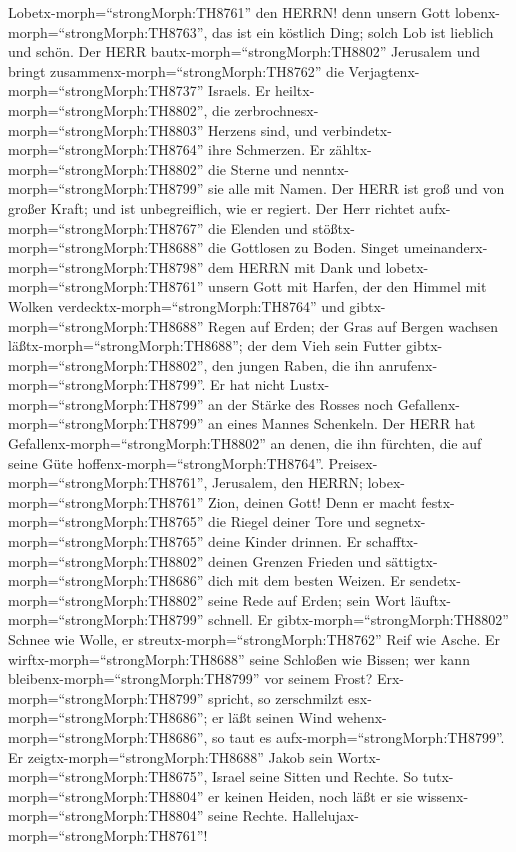 Lobetx-morph=``strongMorph:TH8761'' den HERRN! denn unsern
Gott lobenx-morph=``strongMorph:TH8763'', das ist ein köstlich Ding;
solch Lob ist lieblich und schön.  Der HERR
bautx-morph=``strongMorph:TH8802'' Jerusalem und bringt
zusammenx-morph=``strongMorph:TH8762'' die
Verjagtenx-morph=``strongMorph:TH8737'' Israels.  Er
heiltx-morph=``strongMorph:TH8802'', die
zerbrochnesx-morph=``strongMorph:TH8803'' Herzens sind, und
verbindetx-morph=``strongMorph:TH8764'' ihre Schmerzen.  Er
zähltx-morph=``strongMorph:TH8802'' die Sterne und
nenntx-morph=``strongMorph:TH8799'' sie alle mit Namen.  Der
HERR ist groß und von großer Kraft; und ist unbegreiflich, wie er
regiert.  Der Herr richtet aufx-morph=``strongMorph:TH8767''
die Elenden und stößtx-morph=``strongMorph:TH8688'' die Gottlosen zu
Boden.  Singet umeinanderx-morph=``strongMorph:TH8798'' dem
HERRN mit Dank und lobetx-morph=``strongMorph:TH8761'' unsern Gott mit
Harfen,  der den Himmel mit Wolken
verdecktx-morph=``strongMorph:TH8764'' und
gibtx-morph=``strongMorph:TH8688'' Regen auf Erden; der Gras auf Bergen
wachsen läßtx-morph=``strongMorph:TH8688'';  der dem Vieh
sein Futter gibtx-morph=``strongMorph:TH8802'', den jungen Raben, die
ihn anrufenx-morph=``strongMorph:TH8799''.  Er hat nicht
Lustx-morph=``strongMorph:TH8799'' an der Stärke des Rosses noch
Gefallenx-morph=``strongMorph:TH8799'' an eines Mannes Schenkeln.
 Der HERR hat Gefallenx-morph=``strongMorph:TH8802'' an
denen, die ihn fürchten, die auf seine Güte
hoffenx-morph=``strongMorph:TH8764''. 
Preisex-morph=``strongMorph:TH8761'', Jerusalem, den HERRN;
lobex-morph=``strongMorph:TH8761'' Zion, deinen Gott!  Denn
er macht festx-morph=``strongMorph:TH8765'' die Riegel deiner Tore und
segnetx-morph=``strongMorph:TH8765'' deine Kinder drinnen. 
Er schafftx-morph=``strongMorph:TH8802'' deinen Grenzen Frieden und
sättigtx-morph=``strongMorph:TH8686'' dich mit dem besten Weizen.
 Er sendetx-morph=``strongMorph:TH8802'' seine Rede auf
Erden; sein Wort läuftx-morph=``strongMorph:TH8799'' schnell.
 Er gibtx-morph=``strongMorph:TH8802'' Schnee wie Wolle, er
streutx-morph=``strongMorph:TH8762'' Reif wie Asche.  Er
wirftx-morph=``strongMorph:TH8688'' seine Schloßen wie Bissen; wer kann
bleibenx-morph=``strongMorph:TH8799'' vor seinem Frost? 
Erx-morph=``strongMorph:TH8799'' spricht, so zerschmilzt
esx-morph=``strongMorph:TH8686''; er läßt seinen Wind
wehenx-morph=``strongMorph:TH8686'', so taut es
aufx-morph=``strongMorph:TH8799''.  Er
zeigtx-morph=``strongMorph:TH8688'' Jakob sein
Wortx-morph=``strongMorph:TH8675'', Israel seine Sitten und Rechte.
 So tutx-morph=``strongMorph:TH8804'' er keinen Heiden,
noch läßt er sie wissenx-morph=``strongMorph:TH8804'' seine Rechte.
Hallelujax-morph=``strongMorph:TH8761''!

